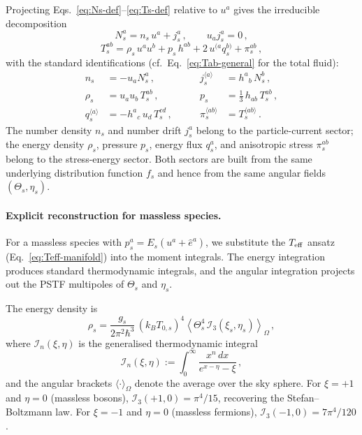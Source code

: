 Projecting Eqs.~\eqref{eq:Ns-def}--\eqref{eq:Ts-def}
relative to $u^a$ gives the irreducible decomposition
\begin{equation}\label{eq:Ns-decomp}
N_s^a = n_s\, u^a + j_s^a\,,
\qquad u_a j_s^a = 0\,,
\end{equation}
\begin{equation}\label{eq:Ts-decomp}
T_s^{ab}
= \rho_s\, u^a u^b + p_s\, h^{ab}
  + 2\,u^{(a} q_s^{b)} + \pi_s^{ab}\,,
\end{equation}
with the standard identifications
(cf.\ Eq.~\ref{eq:Tab-general} for the total fluid):
\begin{equation}\label{eq:species-projections}
\begin{aligned}
n_s &= -u_a N_s^a\,,
&\qquad
j_s^{\langle a\rangle} &= h^a{}_b\, N_s^b\,,\\[4pt]
\rho_s &= u_a u_b\, T_s^{ab}\,,
&\qquad
p_s &= \tfrac{1}{3}\, h_{ab}\, T_s^{ab}\,,\\[4pt]
q_s^{\langle a\rangle} &= -h^a{}_c\, u_d\, T_s^{cd}\,,
&\qquad
\pi_s^{\langle ab\rangle}
  &= T_s^{\langle ab \rangle}\,.
\end{aligned}
\end{equation}
The number density $n_s$ and number drift $j_s^a$
belong to the particle-current sector; the energy
density $\rho_s$, pressure $p_s$, energy flux $q_s^a$,
and anisotropic stress $\pi_s^{ab}$ belong to the
stress-energy sector.  Both sectors are built from the
same underlying distribution function $f_s$ and hence
from the same angular fields $(\Theta_s, \eta_s)$.


\paragraph{Explicit reconstruction for massless species.}

For a massless species with $p_s^a = E_s(u^a +
\hat{e}^a)$, we substitute the $T_{\mathrm{eff}}$ ansatz
(Eq.~\ref{eq:Teff-manifold}) into the moment integrals.
The energy integration produces standard thermodynamic
integrals, and the angular integration projects out the
PSTF multipoles of $\Theta_s$ and $\eta_s$.

The energy density is
\begin{equation}\label{eq:rho-s-recon}
\rho_s
= \frac{g_s}{2\pi^2\hbar^3}\,(k_B T_{0,s})^4
  \left\langle \Theta_s^4\, \mathcal{I}_3(\xi_s,
  \eta_s) \right\rangle_\Omega\,,
\end{equation}
where $\mathcal{I}_n(\xi, \eta)$ is the generalised
thermodynamic integral
\begin{equation}\label{eq:thermo-integral}
\mathcal{I}_n(\xi, \eta)
:= \int_0^\infty
  \frac{x^n\, dx}{e^{x - \eta} - \xi}\,,
\end{equation}
and the angular brackets $\langle \cdot
\rangle_\Omega$ denote the average over the sky sphere.
For $\xi = +1$ and $\eta = 0$ (massless bosons),
$\mathcal{I}_3(+1, 0) = \pi^4/15$, recovering the
Stefan--Boltzmann law.  For $\xi = -1$ and $\eta = 0$
(massless fermions),
$\mathcal{I}_3(-1, 0) = 7\pi^4/120$.

